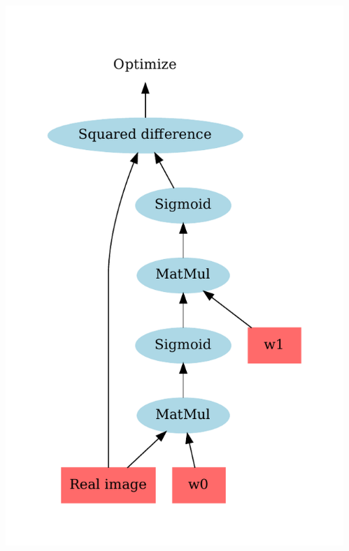 \documentclass{beamer}
\begin{document}
\begin{frame}
\begin{columns}
\begin{column}{0.5\textwidth}
	\includegraphics[width=\textwidth]{sq_diff.pdf}
	\pause
\end{column}
\begin{column}{0.5\textwidth}  %

\end{column}
\end{columns}
\end{frame}
\end{document}
